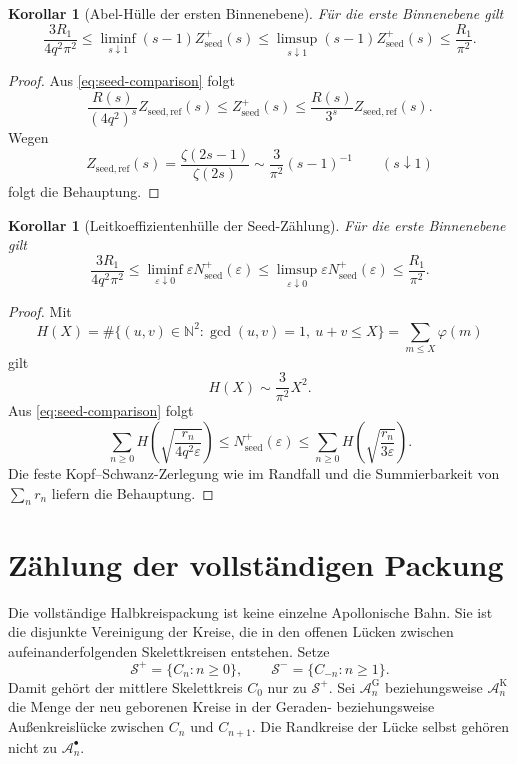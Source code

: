 \documentclass[11pt,a4paper]{article}
\newtheorem{corollary}[remark]{Korollar}
\begin{document}
\begin{corollary}[Abel-Hülle der ersten Binnenebene]
Für die erste Binnenebene gilt
\[
 \frac{3R_1}{4q^2\pi^2}
 \le
 \liminf_{s\downarrow1}(s-1)Z_{\mathrm{seed}}^+(s)
 \le
 \limsup_{s\downarrow1}(s-1)Z_{\mathrm{seed}}^+(s)
 \le
 \frac{R_1}{\pi^2}.
\]
\end{corollary}

\begin{proof}
Aus \eqref{eq:seed-comparison} folgt
\[
 \frac{R(s)}{(4q^2)^s}Z_{\mathrm{seed,ref}}(s)
 \le Z_{\mathrm{seed}}^+(s)
 \le \frac{R(s)}{3^s}Z_{\mathrm{seed,ref}}(s).
\]
Wegen
\[
 Z_{\mathrm{seed,ref}}(s)
 =\frac{\zeta(2s-1)}{\zeta(2s)}
 \sim\frac3{\pi^2}(s-1)^{-1}
 \qquad(s\downarrow1)
\]
folgt die Behauptung.
\end{proof}

\begin{corollary}[Leitkoeffizientenhülle der Seed-Zählung]
Für die erste Binnenebene gilt
\[
 \frac{3R_1}{4q^2\pi^2}
 \le
 \liminf_{\varepsilon\downarrow0}
 \varepsilon N_{\mathrm{seed}}^+(\varepsilon)
 \le
 \limsup_{\varepsilon\downarrow0}
 \varepsilon N_{\mathrm{seed}}^+(\varepsilon)
 \le
 \frac{R_1}{\pi^2}.
\]
\end{corollary}

\begin{proof}
Mit
\[
 H(X)=\#\{(u,v)\in\mathbb N^2:\gcd(u,v)=1,\ u+v\le X\}
 =\sum_{m\le X}\varphi(m)
\]
gilt
\[
 H(X)\sim\frac3{\pi^2}X^2.
\]
Aus \eqref{eq:seed-comparison} folgt
\[
 \sum_{n\ge0}
 H\!\left(\sqrt{\frac{r_n}{4q^2\varepsilon}}\right)
 \le N_{\mathrm{seed}}^+(\varepsilon)
 \le
 \sum_{n\ge0}
 H\!\left(\sqrt{\frac{r_n}{3\varepsilon}}\right).
\]
Die feste Kopf--Schwanz-Zerlegung wie im Randfall und die Summierbarkeit
von $\sum_nr_n$ liefern die Behauptung.
\end{proof}

\section{Zählung der vollständigen Packung}

Die vollständige Halbkreispackung ist keine einzelne Apollonische Bahn. Sie
ist die disjunkte Vereinigung der Kreise, die in den offenen Lücken zwischen
aufeinanderfolgenden Skelettkreisen entstehen. Setze
\[
 \mathcal S^+=\{C_n:n\ge0\},
 \qquad
 \mathcal S^-=\{C_{-n}:n\ge1\}.
\]
Damit gehört der mittlere Skelettkreis $C_0$ nur zu $\mathcal S^+$.
Sei
$\mathcal A_n^{\mathrm{G}}$ beziehungsweise
$\mathcal A_n^{\mathrm{K}}$ die Menge der neu geborenen Kreise in der
Geraden- beziehungsweise Außenkreislücke zwischen $C_n$ und $C_{n+1}$.
Die Randkreise der Lücke selbst gehören nicht zu $\mathcal A_n^{\bullet}$.
\end{document}
